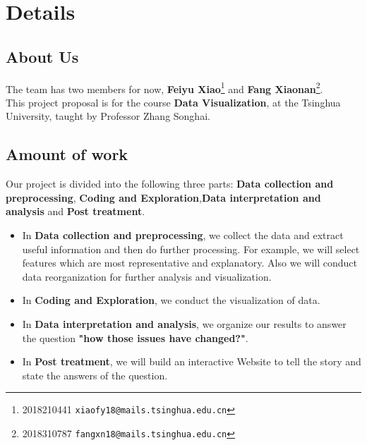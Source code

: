 \documentclass{article}
\begin{document}
\section{Details}
\subsection{About Us}
The team has two members for now, \textbf{Feiyu Xiao}\footnote{2018210441 \quad  \texttt{xiaofy18@mails.tsinghua.edu.cn}} and \textbf{Fang Xiaonan}\footnote{2018310787 \quad  \texttt{fangxn18@mails.tsinghua.edu.cn}}.\\

This project proposal is for the course \textbf{Data Visualization}, at the Tsinghua University, taught by Professor Zhang Songhai.
\subsection{Amount of work}
Our project is divided into the following three parts: \textbf{Data collection and preprocessing}, \textbf{Coding and Exploration},\textbf{Data interpretation and analysis} and \textbf{
Post treatment}.\\
\begin{itemize}
	\item In \textbf{Data collection and preprocessing}, we collect the data and extract useful information and then do further processing. For example, we will select features which are most representative and explanatory. Also we will conduct data reorganization for further analysis and visualization.
	\item In \textbf{Coding and Exploration}, we conduct the visualization of data.
	\item In \textbf{Data interpretation and analysis}, we organize our results to answer the question \textbf{"how those issues have changed?"}.
	\item In \textbf{Post treatment}, we will build an interactive Website to tell the story and state the answers of the question.
\end{itemize}
\end{document}
